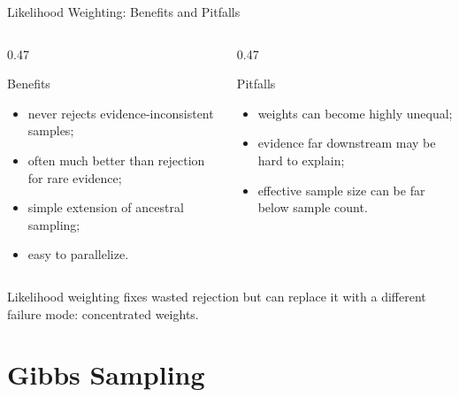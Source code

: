 \documentclass[aspectratio=169,10pt]{beamer}
\begin{document}
\begin{frame}[shrink=10]{Likelihood Weighting: Benefits and Pitfalls}
  \begin{columns}[T,onlytextwidth]
    \begin{column}{0.47\textwidth}
      \begin{block}{Benefits}
        \begin{itemize}
          \item never rejects evidence-inconsistent samples;
          \item often much better than rejection for rare evidence;
          \item simple extension of ancestral sampling;
          \item easy to parallelize.
        \end{itemize}
      \end{block}
    \end{column}
    \begin{column}{0.47\textwidth}
      \begin{block}{Pitfalls}
        \begin{itemize}
          \item weights can become highly unequal;
          \item evidence far downstream may be hard to explain;
          \item effective sample size can be far below sample count.
        \end{itemize}
      \end{block}
    \end{column}
  \end{columns}

  \begin{keyidea}
    Likelihood weighting fixes wasted rejection but can replace it with a different failure mode: concentrated weights.
  \end{keyidea}
\end{frame}

\section{Gibbs Sampling}
\end{document}
